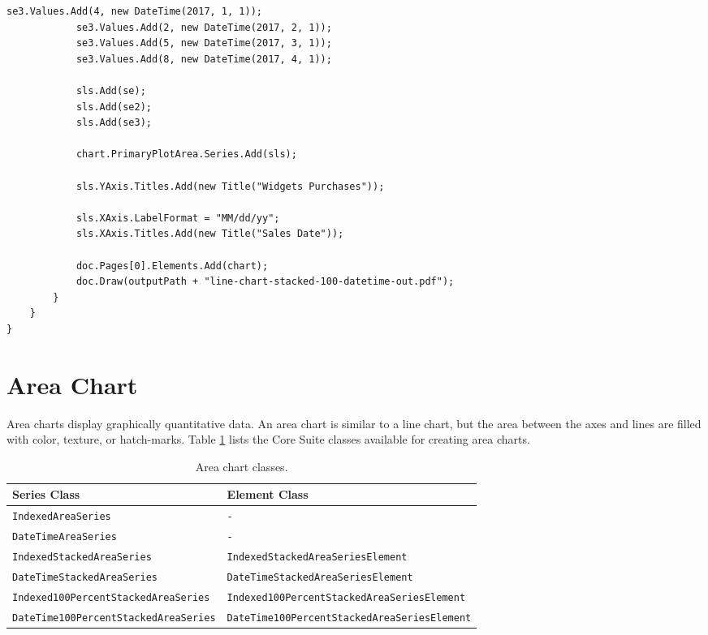\documentclass[american,letterpaper]{tufte-book}
\providecommand{\tabularnewline}{\\}
\numberwithin{equation}{section}
\numberwithin{figure}{section}
\begin{document}
{\begin{lstlisting}[caption={Stacked 100\% date/time line chart.},label={lis:dt-Stacked-100=000025-date/time},basicstyle={\small\ttfamily},breaklines=true]
            se3.Values.Add(4, new DateTime(2017, 1, 1));
            se3.Values.Add(2, new DateTime(2017, 2, 1));
            se3.Values.Add(5, new DateTime(2017, 3, 1));
            se3.Values.Add(8, new DateTime(2017, 4, 1));

            sls.Add(se);
            sls.Add(se2);
            sls.Add(se3);

            chart.PrimaryPlotArea.Series.Add(sls);

            sls.YAxis.Titles.Add(new Title("Widgets Purchases"));

            sls.XAxis.LabelFormat = "MM/dd/yy";
            sls.XAxis.Titles.Add(new Title("Sales Date"));

            doc.Pages[0].Elements.Add(chart);
            doc.Draw(outputPath + "line-chart-stacked-100-datetime-out.pdf");
        }
    }
}
\end{lstlisting}
\leavevmode\egroup


\section{Area Chart}\label{sec:Area-Chart}

Area charts display graphically quantitative data. An area chart is
similar to a line chart, but the area between the axes and lines are
filled with color, texture, or hatch-marks. Table \ref{tab:area-chart-Core-Suite-classes-1-1-1}
lists the Core Suite classes available for creating area charts.

\begin{table}
\raggedright
\begin{tabular}{p{}p{}}
\toprule 
{\scriptsize Series Class} & {\scriptsize Element Class}\tabularnewline
\midrule
{\scriptsize\texttt{IndexedAreaSeries}} & {\scriptsize\texttt{-}}\tabularnewline
{\scriptsize\texttt{DateTimeAreaSeries}} & {\scriptsize\texttt{-}}\tabularnewline
{\scriptsize\texttt{IndexedStackedAreaSeries}} & {\scriptsize\texttt{IndexedStackedAreaSeriesElement}}\tabularnewline
{\scriptsize\texttt{DateTimeStackedAreaSeries}} & {\scriptsize\texttt{DateTimeStackedAreaSeriesElement}}\tabularnewline
{\scriptsize\texttt{Indexed100PercentStackedAreaSeries}} & {\scriptsize\texttt{Indexed100PercentStackedAreaSeriesElement}}\tabularnewline
{\scriptsize\texttt{DateTime100PercentStackedAreaSeries}} & {\scriptsize\texttt{DateTime100PercentStackedAreaSeriesElement}}\tabularnewline
\bottomrule
\end{tabular}\caption{Area chart classes.}\label{tab:area-chart-Core-Suite-classes-1-1-1}
\end{table}

}
\end{document}
